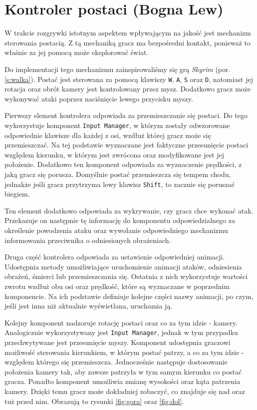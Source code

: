 \section{Kontroler postaci (Bogna Lew)}\label{s:por_impl}
W trakcie rozgrywki istotnym aspektem wpływającym na jakość jest mechanizm sterowania postacią. Z tą mechaniką gracz ma
bezpośredni kontakt, ponieważ to właśnie za jej pomocą może eksplorować świat.

Do implementacji tego mechanizmu zainspirowaliśmy się grą \textit{Skyrim} (por. \ref{s:walka}). Postać jest sterowana za pomocą klawiszy \texttt{W}, \texttt{A}, \texttt{S}
oraz \texttt{D}, natomiast jej rotacja oraz obrót kamery jest kontrolowany przez mysz. Dodatkowo gracz może wykonywać ataki
poprzez naciśnięcie lewego przycisku myszy.

Pierwszy element kontrolera odpowiada za przemieszczanie się postaci. Do tego wykorzystuje komponent \texttt{Input Manager}, w
którym zostały odwzorowane odpowiednie klawisze dla każdej z osi, wzdłuż której gracz może się przemieszczać. Na tej
podstawie wyznaczane jest faktyczne przesunięcie postaci względem kierunku, w którym jest zwrócona oraz modyfikowane
jest jej położenie. Dodatkowo ten komponent odpowiada za wyznaczenie prędkości, z jaką gracz się porusza. Domyślnie
postać przemieszcza się tempem chodu, jednakże jeśli gracz przytrzyma lewy klawisz \texttt{Shift}, to zacznie się poruszać biegiem.

Ten element dodatkowo odpowiada za wykrywanie, czy gracz chce wykonać atak. Przekazuje on następnie tę informację do
komponentu odpowiedzialnego za określenie powodzenia ataku oraz wywołanie odpowiedniego mechanizmu informowania
przeciwnika o odniesionych obrażeniach.

Druga część kontrolera odpowiada za ustawienie odpowiedniej animacji. Udostępnia metody umożliwiające uruchomienie
animacji ataków, odniesienia obrażeń, śmierci lub przemieszczania się. Ostatnia z nich wykorzystuje wartości zwrotu wzdłuż
obu osi oraz prędkość, które są wyznaczane w poprzednim komponencie. Na ich podstawie definiuje kolejne części nazwy
animacji, po czym, jeśli jest inna niż aktualnie wyświetlana, uruchamia ją.

Kolejny komponent nadzoruje rotację postaci oraz co za tym idzie - kamery. Analogicznie wykorzystywany jest \texttt{Input
Manager}, jednak w tym przypadku przechwytywane jest przesunięcie myszy. Komponent udostępnia graczowi możliwość
sterowania kierunkiem, w którym postać patrzy, a co za tym idzie - względem którego się przemieszcza. Jednocześnie
następuje dostosowanie położenia kamery tak, aby zawsze patrzyła w tym samym kierunku co postać gracza. Ponadto
komponent umożliwia zmianę wysokości oraz kąta patrzenia kamery. Dzięki temu gracz może dokładniej zobaczyć,
co znajduje się nad oraz tuż przed nim. Obrazują to rysunki \ref{fig:gora} oraz \ref{fig:dol}.

